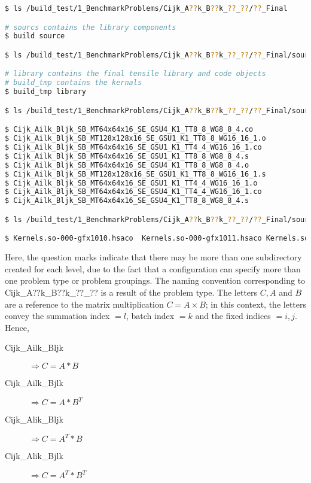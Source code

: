\documentclass[]{article}
\begin{document}
\begin{lstlisting}[language=bash,breaklines=true, emph={build,ls,build_tmp,library}, emphstyle=\color{blue}]
$ ls /build_test/1_BenchmarkProblems/Cijk_A??k_B??k_??_??/??_Final

# sourcs contains the library components
$ build source

$ ls /build_test/1_BenchmarkProblems/Cijk_A??k_B??k_??_??/??_Final/source

# library contains the final tensile library and code objects
# build_tmp contains the kernals
$ build_tmp library

$ ls /build_test/1_BenchmarkProblems/Cijk_A??k_B??k_??_??/??_Final/source/build_tmp/SOURCETMP/assembly

$ Cijk_Ailk_Bljk_SB_MT64x64x16_SE_GSU4_K1_TT8_8_WG8_8_4.co
$ Cijk_Ailk_Bljk_SB_MT128x128x16_SE_GSU1_K1_TT8_8_WG16_16_1.o
$ Cijk_Ailk_Bljk_SB_MT64x64x16_SE_GSU1_K1_TT4_4_WG16_16_1.co
$ Cijk_Ailk_Bljk_SB_MT64x64x16_SE_GSU1_K1_TT8_8_WG8_8_4.s
$ Cijk_Ailk_Bljk_SB_MT64x64x16_SE_GSU4_K1_TT8_8_WG8_8_4.o
$ Cijk_Ailk_Bljk_SB_MT128x128x16_SE_GSU1_K1_TT8_8_WG16_16_1.s
$ Cijk_Ailk_Bljk_SB_MT64x64x16_SE_GSU1_K1_TT4_4_WG16_16_1.o
$ Cijk_Ailk_Bljk_SB_MT64x64x16_SE_GSU4_K1_TT4_4_WG16_16_1.co
$ Cijk_Ailk_Bljk_SB_MT64x64x16_SE_GSU4_K1_TT8_8_WG8_8_4.s

$ ls /build_test/1_BenchmarkProblems/Cijk_A??k_B??k_??_??/??_Final/source/library

$ Kernels.so-000-gfx1010.hsaco  Kernels.so-000-gfx1011.hsaco Kernels.so-000-gfx803.hsaco Kernels.so-000-gfx900.hsaco Kernels.so-000-gfx906.hsaco  Kernels.so-000-gfx908.hsaco TensileLibrary_gfx906.co TensileLibrary.yaml

\end{lstlisting}

\noindent
Here, the question marks indicate that there may be more than one subdirectory created for each level, due to the fact that a configuration can specify more than one problem type or problem groupings. The naming convention corresponding to Cijk\_A??k\_B??k\_??\_?? is a result of the problem type. The letters $ C, A $ and $ B $ are a reference to the matrix multiplication $ C = A \times B $; in this context, the letters convey the summation index $= l$, batch index $= k$ and the fixed indices $=i,j$. Hence,

\begin{description}
	\item[Cijk\_Ailk\_Bljk]  $ \Longrightarrow C = A * B $
	\item[Cijk\_Ailk\_Bjlk]  $ \Longrightarrow C = A * B^T $
	\item[Cijk\_Alik\_Bljk]  $ \Longrightarrow C = A^T * B $
	\item[Cijk\_Alik\_Bjlk]  $ \Longrightarrow C = A^T * B^T $
\end{description}
\end{document}
